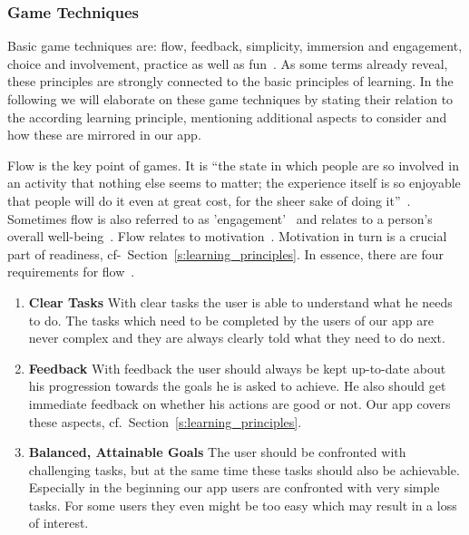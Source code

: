 \subsubsection{Game Techniques}
Basic game techniques are: flow, feedback, simplicity, immersion and engagement, choice and involvement, practice as well as fun~\cite{murphy2011games}.
As some terms already reveal, these principles are strongly connected to the basic principles of learning.
In the following we will elaborate on these game techniques by stating their relation to the according learning principle, mentioning  additional aspects to consider and how these are mirrored in our app.

\begin{description}[leftmargin=0cm]
	\item[Flow] Flow is the key point of games. It is ``the state in which people are so involved in an activity that nothing else seems to matter; the experience itself is so enjoyable that people will do it even at great cost, for the sheer sake of doing it''~\cite{csikszentmihalyi1990flow}.
Sometimes flow is also referred to as 'engagement'~\cite{murphy2011games} and relates to a person's overall well-being~\cite{seligman2012flourish}. 
Flow relates to motivation~\cite{csikszentmihalyi1990flow, csikszentmihalyi1997finding}. Motivation in turn is a crucial part of readiness, cf-~Section~\ref{s:learning_principles}.
In essence, there are four requirements for flow~\cite{csikszentmihalyi1990flow, csikszentmihalyi1997finding, schell2008art}.
	\begin{enumerate}
		\item \textbf{Clear Tasks} With clear tasks the user is able to understand what he needs to do. 
The tasks which need to be completed by the users of our app are never complex and they are always clearly told what they need to do next. 
		\item \textbf{Feedback} With feedback the user should always be kept up-to-date about his progression towards the goals he is asked to achieve. 
He also should get immediate feedback on whether his actions are good or not. 
Our app covers these aspects, cf.~Section~\ref{s:learning_principles}.
		\item \textbf{Balanced, Attainable Goals} The user should be confronted with challenging tasks, but at the same time these tasks should also be achievable. 
Especially in the beginning our app users are confronted with very simple tasks.
For some users they even might be too easy which may result in a loss of interest.

\end{enumerate}
\end{description}
